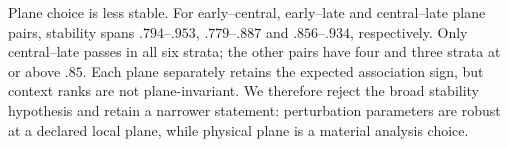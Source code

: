 \documentclass[10pt,twocolumn,letterpaper]{article}
\begin{document}
Plane choice is less stable. For early--central, early--late and central--late plane pairs, stability spans $.794$--$.953$, $.779$--$.887$ and $.856$--$.934$, respectively. Only central--late passes in all six strata; the other pairs have four and three strata at or above $.85$. Each plane separately retains the expected association sign, but context ranks are not plane-invariant. We therefore reject the broad stability hypothesis and retain a narrower statement: perturbation parameters are robust at a declared local plane, while physical plane is a material analysis choice.

\begin{table}[t]
\centering
\caption{P7-CV-E02 stability gates across six dataset--architecture strata.}
\label{tab:s_stability}
\end{table}
\end{document}

